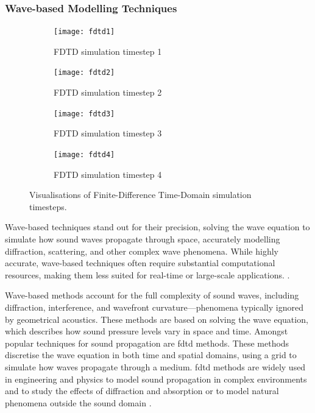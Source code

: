 \subsubsection{Wave-based Modelling Techniques}
\begin{figure}
    \begin{subfigure}{0.5\textwidth}
        \centering
        \texttt{[image: fdtd1]}
        \caption{FDTD simulation timestep 1}
    \end{subfigure}
    \begin{subfigure}{0.5\linewidth}
        \centering
        \texttt{[image: fdtd2]}
        \caption{FDTD simulation timestep 2}
    \end{subfigure}

    \begin{subfigure}{0.5\linewidth}
        \centering
        \texttt{[image: fdtd3]}
        \caption{FDTD simulation timestep 3}
    \end{subfigure}
    \begin{subfigure}{0.5\linewidth}
        \centering
        \texttt{[image: fdtd4]}
        \caption{FDTD simulation timestep 4}
    \end{subfigure}
    \caption[Visualisations of Finite-Difference Time-Domain simulation timesteps]{Visualisations of Finite-Difference Time-Domain simulation timesteps.}
\end{figure}


Wave-based techniques stand out for their precision, solving the wave equation to simulate how sound waves propagate through space, accurately modelling diffraction, scattering, and other complex wave phenomena. While highly accurate, wave-based techniques often require substantial computational resources, making them less suited for real-time or large-scale applications. \citep{hamilton2017fdtd, raghuvanshi2014parametric}.\par
Wave-based methods account for the full complexity of sound waves, including diffraction, interference, and wavefront curvature—phenomena typically ignored by geometrical acoustics. These methods are based on solving the wave equation, which describes how sound pressure levels vary in space and time.
Amongst popular techniques for sound propagation are \acrfull{fdtd} methods. These methods discretise the wave equation in both time and spatial domains, using a grid to simulate how waves propagate through a medium. \acrshort{fdtd} methods are widely used in engineering and physics to model sound propagation in complex environments and to study the effects of diffraction and absorption or to model natural phenomena outside the sound domain \citep{teixeira2023finite}.


